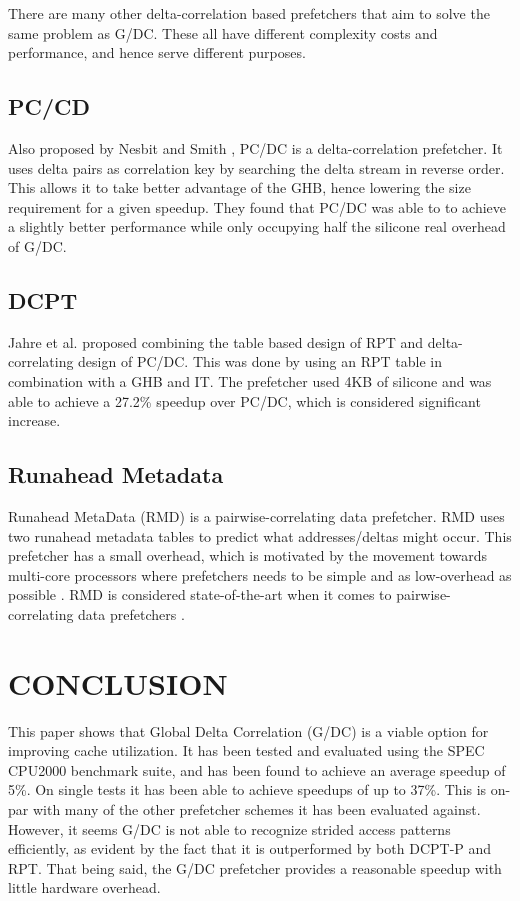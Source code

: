\documentclass[conference]{IEEEtran}
\begin{document}
    There are many other delta-correlation based prefetchers that aim to solve the same problem as G/DC. These all have different complexity costs and performance, and hence serve different purposes.

\subsection{PC/CD}
Also proposed by Nesbit and Smith \cite{b1}, PC/DC is a delta-correlation prefetcher. It uses delta pairs as correlation key by searching the delta stream in reverse order. This allows it to take better advantage of the GHB, hence lowering the size requirement for a given speedup.
They found that PC/DC was able to to achieve a slightly better performance while only occupying half the silicone real overhead of G/DC.

\subsection{DCPT}
Jahre et al. \cite{dcpt} proposed combining the table based design of RPT and delta-correlating design of PC/DC. This was done by using an RPT table in combination with a GHB and IT. The prefetcher used 4KB of silicone and was able to achieve a 27.2\% speedup over PC/DC, which is considered significant increase.

\subsection{Runahead Metadata}
Runahead MetaData (RMD) \cite{b6} is a pairwise-correlating data prefetcher. RMD uses two runahead metadata tables to predict what addresses/deltas might occur. This prefetcher has a small overhead, which is motivated by the movement towards multi-core processors where prefetchers needs to be simple and as low-overhead as possible \cite{b13}. RMD is considered state-of-the-art when it comes to pairwise-correlating data prefetchers \cite{b6}.


\section{CONCLUSION}

This paper shows that Global Delta Correlation (G/DC) is a viable option for improving cache utilization. It has been tested and evaluated using the SPEC CPU2000 benchmark suite, and has been found to achieve an average speedup of 5\%. On single tests it has been able to achieve speedups of up to 37\%. This is on-par with many of the other prefetcher schemes it has been evaluated against. However, it seems G/DC is not able to recognize strided access patterns efficiently, as evident by the fact that it is outperformed by both DCPT-P and RPT. That being said, the G/DC prefetcher provides a reasonable speedup with little hardware overhead. 




\end{document}
